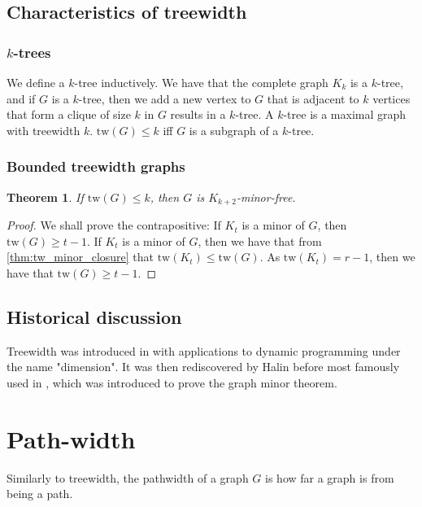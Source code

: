 \documentclass[]{report}
\newcommand{\tw}{\text{tw}}
\newtheorem{theorem}{Theorem}
\theoremstyle{definition}
\numberwithin{theorem}{section}
\numberwithin{equation}{section}
\begin{document}
\subsection{Characteristics of treewidth}\label{ssec:characterising_Treewidth}
\subsubsection{$k$-trees}\label{sssec:k-trees}
We define a $k$-tree inductively. We have that the complete graph $K_k$ is a $k$-tree, and if $G$ is a $k$-tree, then we add a new vertex to $G$ that is adjacent to $k$ vertices that form a clique of size $k$ in $G$ results in a $k$-tree. 
A $k$-tree is a maximal graph with treewidth $k$. $\tw(G) \leq k$ iff $G$ is a subgraph of a $k$-tree. 


\subsubsection{Bounded treewidth graphs}\label{sssec:Graph_treewidth_Bounded}
\begin{theorem}\label{thm:treewidth_clique-minor-free}
	If $\tw(G) \leq k$, then $G$ is $K_{k+2}$-minor-free. 
\end{theorem}
\begin{proof}
	We shall prove the contrapositive: If $K_t$ is a minor of $G$, then $\tw(G) \geq t-1$.
	If $K_t$ is a minor of $G$, then we have that from \cref{thm:tw_minor_closure} that $\tw(K_t) \leq \tw(G)$. As $\tw(K_t) = r-1$, then we have that $\tw(G) \geq t - 1$. 
\end{proof}

\subsection{Historical discussion}\label{ssec:tw_historical}
Treewidth was introduced in \cite{berteleChapterEliminationVariables1972} with applications to dynamic programming under the name "dimension". It was then rediscovered by Halin \cite{halinSfunctionsGraphs1976} before most famously used in \cite{robertsonGraphMinorsIII1984}, which was introduced to prove the graph minor theorem\cite{robertsonGraphMinorsXX2004}.


\section{Path-width}
Similarly to treewidth, the pathwidth of a graph $G$ is how far a graph is from being a path. 
\end{document}
